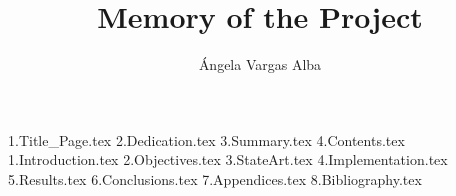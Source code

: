 \documentclass[a4paper, 12pt]{book}
\title{Memory of the Project}
\author{Ángela Vargas Alba}
\begin{document}
\renewcommand{\appendixname}{Apéndice}

{1.Title_Page.tex}
{2.Dedication.tex}
{3.Summary.tex}
{4.Contents.tex}
{1.Introduction.tex}
{2.Objectives.tex}
{3.StateArt.tex}
{4.Implementation.tex}
{5.Results.tex}
{6.Conclusions.tex}
{7.Appendices.tex}
{8.Bibliography.tex}
\end{document}
